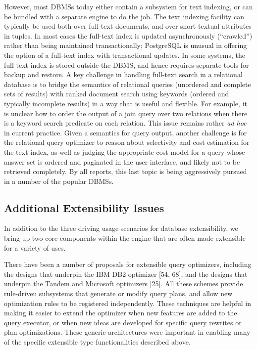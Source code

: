 \documentclass[a4paper,11pt,twoside,openright]{book}
\begin{document}
However, most DBMSs today either contain a subsystem for text indexing,
or can be bundled with a separate engine to do the job. The text
indexing facility can typically be used both over full-text documents,
and over short textual attributes in tuples. In most cases the full-text
index is updated asynchronously (``crawled'') rather than being
maintained transactionally; PostgreSQL is unusual in offering the option
of a full-text index with transactional updates. In some systems,
the full-text index is stored outside the DBMS, and hence requires
separate tools for backup and restore. A key challenge in handling
full-text search in a relational database is to bridge the semantics of
relational queries (unordered and complete sets of results) with ranked
document search using keywords (ordered and typically incomplete
results) in a way that is useful and flexible. For example, it is
unclear how to order the output of a join query over two relations when
there is a keyword search predicate on each relation. This issue remains
rather \emph{ad hoc} in current practice. Given a semantics for query
output, another challenge is for the relational query optimizer to
reason about selectivity and cost estimation for the text index, as well
as judging the appropriate cost model for a query whose answer set is
ordered and paginated in the user interface, and likely not to be
retrieved completely. By all reports, this last topic is being
aggressively pursued in a number of the popular DBMSs.

\hypertarget{additional-extensibility-issues}{%
\subsection{Additional Extensibility
Issues}\label{additional-extensibility-issues}}

In addition to the three driving usage scenarios for database
extensibility, we bring up two core components within the engine that
are often made extensible for a variety of uses.

There have been a number of proposals for extensible query optimizers,
including the designs that underpin the IBM DB2 optimizer {[}54, 68{]},
and the designs that underpin the Tandem and Microsoft optimizers {[}25{]}.
All these schemes provide rule-driven subsystems that generate or
modify query plans, and allow new optimization rules to be registered
independently. These techniques are helpful in making it easier to
extend the optimizer when new features are added to the query
executor, or when new ideas are developed for specific query rewrites
or plan optimizations. These generic architectures were important in
enabling many of the specific extensible type functionalities
described above.
\end{document}

